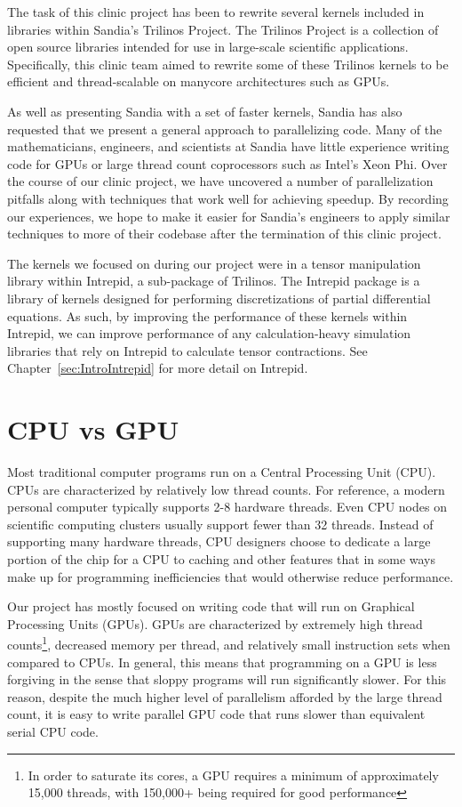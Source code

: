 The task of this clinic project has been to rewrite several kernels included in
libraries within Sandia's Trilinos Project. The Trilinos Project is a
collection of open source libraries intended for use in large-scale scientific
applications. Specifically, this clinic team aimed to rewrite some of these Trilinos kernels to be
efficient and thread-scalable on manycore architectures such as GPUs.

As well as presenting Sandia with a set of faster kernels, Sandia has also
requested that we present a general approach to parallelizing code. Many of the
mathematicians, engineers, and scientists at Sandia have little experience
writing code for GPUs or large thread count coprocessors such as Intel's Xeon Phi. Over
the course of our clinic project, we have uncovered a number of parallelization pitfalls 
along with techniques that work well for achieving speedup. By recording our experiences, we hope to
make it easier for Sandia's engineers to apply similar techniques to more of
their codebase after the termination of this clinic project.

The kernels we focused on during our project were in a tensor manipulation
library within Intrepid, a sub-package of Trilinos. The Intrepid package is a
library of kernels designed for performing discretizations of partial
differential equations. As such, by improving the performance of these kernels
within Intrepid, we can improve performance of any calculation-heavy simulation
libraries that rely on Intrepid to calculate tensor contractions. See
Chapter~\ref{sec:IntroIntrepid} for more detail on Intrepid.

\section{CPU vs GPU} \label{CPU-GPU}

Most traditional computer programs run on a Central Processing Unit (CPU). CPUs
are characterized by relatively low thread counts. For reference, a modern personal computer
typically supports 2-8 hardware threads. Even CPU nodes on scientific computing clusters usually
support fewer than 32 threads. Instead of supporting many hardware threads, CPU designers 
choose to dedicate a large portion of the chip for a CPU to
caching and other features that in some ways make up for
programming inefficiencies that would otherwise reduce performance.

Our project has mostly focused on writing code that will run on Graphical
Processing Units (GPUs). GPUs are characterized by extremely high thread counts\footnote{
In order to saturate its cores, a GPU requires a minimum of approximately 15,000 threads, 
with 150,000+ being required for good performance},
decreased memory per thread, and relatively small instruction sets when compared
to CPUs. In general, this means that programming on a GPU is less forgiving in the 
sense that sloppy programs will run significantly slower. For this reason,
despite the much higher level of parallelism afforded by the large thread
count, it is easy to write parallel GPU code that runs slower than
equivalent serial CPU code.

